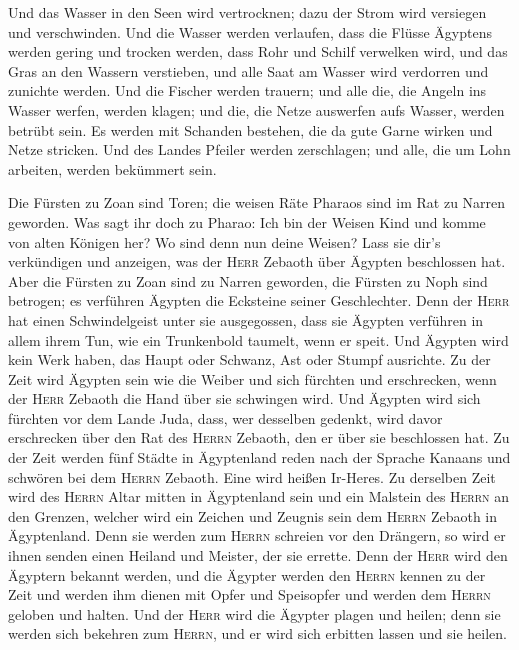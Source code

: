  Und das Wasser in den Seen wird vertrocknen; dazu der
Strom wird versiegen und verschwinden.  Und die Wasser
werden verlaufen, dass die Flüsse Ägyptens werden gering und trocken
werden, dass Rohr und Schilf verwelken wird,  und das Gras
an den Wassern verstieben, und alle Saat am Wasser wird verdorren und
zunichte werden.  Und die Fischer werden trauern; und alle
die, die Angeln ins Wasser werfen, werden klagen; und die, die Netze
auswerfen aufs Wasser, werden betrübt sein.  Es werden mit
Schanden bestehen, die da gute Garne wirken und Netze stricken.
 Und des Landes Pfeiler werden zerschlagen; und alle, die
um Lohn arbeiten, werden bekümmert sein.

 Die Fürsten zu Zoan sind Toren; die weisen Räte Pharaos
sind im Rat zu Narren geworden. Was sagt ihr doch zu Pharao: Ich bin der
Weisen Kind und komme von alten Königen her?  Wo sind
denn nun deine Weisen? Lass sie dir's verkündigen und anzeigen, was der
\textsc{Herr} Zebaoth über Ägypten beschlossen hat.  Aber
die Fürsten zu Zoan sind zu Narren geworden, die Fürsten zu Noph sind
betrogen; es verführen Ägypten die Ecksteine seiner Geschlechter.
 Denn der \textsc{Herr} hat einen Schwindelgeist unter
sie ausgegossen, dass sie Ägypten verführen in allem ihrem Tun, wie ein
Trunkenbold taumelt, wenn er speit.  Und Ägypten wird
kein Werk haben, das Haupt oder Schwanz, Ast oder Stumpf ausrichte.
 Zu der Zeit wird Ägypten sein wie die Weiber und sich
fürchten und erschrecken, wenn der \textsc{Herr} Zebaoth die Hand über
sie schwingen wird.  Und Ägypten wird sich fürchten vor
dem Lande Juda, dass, wer desselben gedenkt, wird davor erschrecken über
den Rat des \textsc{Herrn} Zebaoth, den er über sie beschlossen hat.
 Zu der Zeit werden fünf Städte in Ägyptenland reden nach
der Sprache Kanaans und schwören bei dem \textsc{Herrn} Zebaoth. Eine
wird heißen Ir-Heres.  Zu derselben Zeit wird des
\textsc{Herrn} Altar mitten in Ägyptenland sein und ein Malstein des
\textsc{Herrn} an den Grenzen,  welcher wird ein Zeichen
und Zeugnis sein dem \textsc{Herrn} Zebaoth in Ägyptenland. Denn sie
werden zum \textsc{Herrn} schreien vor den Drängern, so wird er ihnen
senden einen Heiland und Meister, der sie errette.  Denn
der \textsc{Herr} wird den Ägyptern bekannt werden, und die Ägypter
werden den \textsc{Herrn} kennen zu der Zeit und werden ihm dienen mit
Opfer und Speisopfer und werden dem \textsc{Herrn} geloben und halten.
 Und der \textsc{Herr} wird die Ägypter plagen und
heilen; denn sie werden sich bekehren zum \textsc{Herrn}, und er wird
sich erbitten lassen und sie heilen.

